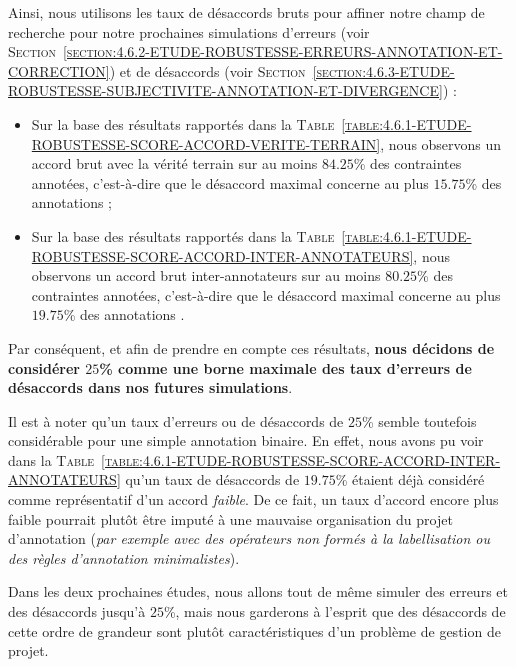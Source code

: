			Ainsi, nous utilisons les taux de désaccords bruts pour affiner notre champ de recherche pour notre prochaines simulations d'erreurs (voir \textsc{Section~\ref{section:4.6.2-ETUDE-ROBUSTESSE-ERREURS-ANNOTATION-ET-CORRECTION}}) et de désaccords (voir \textsc{Section~\ref{section:4.6.3-ETUDE-ROBUSTESSE-SUBJECTIVITE-ANNOTATION-ET-DIVERGENCE}}) :
			\begin{itemize}
				\item  Sur la base des résultats rapportés dans la \textsc{Table~\ref{table:4.6.1-ETUDE-ROBUSTESSE-SCORE-ACCORD-VERITE-TERRAIN}}, nous observons un accord brut avec la vérité terrain sur au moins $84.25$\% des contraintes annotées, c'est-à-dire que le désaccord maximal concerne au plus $15.75$\% des annotations ;
				\item Sur la base des résultats rapportés dans la \textsc{Table~\ref{table:4.6.1-ETUDE-ROBUSTESSE-SCORE-ACCORD-INTER-ANNOTATEURS}}, nous observons un accord brut inter-annotateurs sur au moins $80.25$\% des contraintes annotées, c'est-à-dire que le désaccord maximal concerne au plus $19.75$\% des annotations .
			\end{itemize}
			Par conséquent, et afin de prendre en compte ces résultats, \textbf{nous décidons de considérer $25$\% comme une borne maximale des taux d'erreurs de désaccords dans nos futures simulations}.
			
			\begin{leftBarAuthorOpinion}
				Il est à noter qu'un taux d'erreurs ou de désaccords de $25$\% semble toutefois considérable pour une simple annotation binaire.
				En effet, nous avons pu voir dans la \textsc{Table~\ref{table:4.6.1-ETUDE-ROBUSTESSE-SCORE-ACCORD-INTER-ANNOTATEURS}} qu'un taux de désaccords de $19.75$\% étaient déjà considéré comme représentatif d'un accord \textit{faible}.
				De ce fait, un taux d'accord encore plus faible pourrait plutôt être imputé à une mauvaise organisation du projet d'annotation (\textit{par exemple avec des opérateurs non formés à la labellisation ou des règles d'annotation minimalistes}).
				
				Dans les deux prochaines études, nous allons tout de même simuler des erreurs et des désaccords jusqu'à $25$\%, mais nous garderons à l'esprit que des désaccords de cette ordre de grandeur sont plutôt caractéristiques d'un problème de gestion de projet.
			\end{leftBarAuthorOpinion}
	
